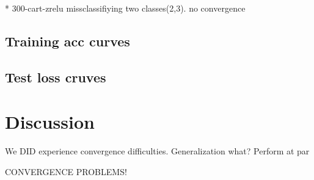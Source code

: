 * 300-cart-zrelu missclassifiying two classes(2,3). no convergence

\subsection{Training acc curves}
\subsection{Test loss cruves}
\section{Discussion}
We DID experience convergence difficulties.
Generalization what?
Perform at par

CONVERGENCE PROBLEMS! 

